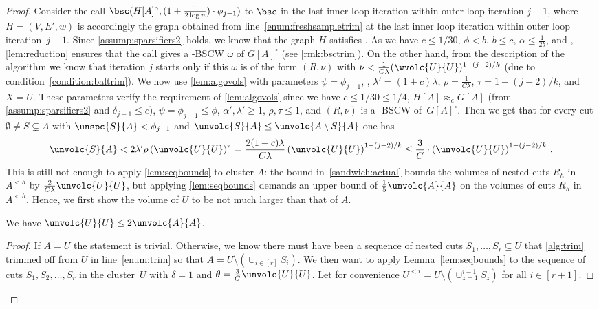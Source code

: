 \begin{proof}
	Consider the call $\bsc(H[A]^\circ, (1+\frac{1}{2\log n}) \cdot \phi_{j-1})$ to $\bsc$ in the last inner loop iteration within outer loop iteration $j-1$, where $H=(V,E',w)$ is accordingly the graph obtained from line~\eqref{enum:freshsampletrim} at the last inner loop iteration within outer loop iteration~${j-1}$. Since \cref{assump:sparsifiers2} holds,  we know that the graph $H$ satisfies . As we have $c \le 1/30$, $\phi < b$, $b \le c$, $\alpha \le \frac{1}{2b}$,  and , \cref{lem:reduction} ensures that the call  gives a -BSCW $\omega$ of $G[A]^\circ$ (see \cref{rmk:bsctrim}). On the other hand, from the description of the algorithm we know that iteration $j$ starts only if this $\omega$ is of the form $(R,\nu)$ with $\nu < \frac{1}{C \lambda}(\wvolc{U}{U})^{1-(j-2)/k}$ (due to condition~\eqref{condition:baltrim}). We now use \cref{lem:algovols} with parameters $\psi=\phi_{j-1}$, , $\lambda' =(1+c)\lambda$, $\rho = \frac{1}{C\lambda}$, $\tau=1-(j-2)/k$, and $X=U$. These parameters verify the requirement of \cref{lem:algovols} since we have $ c\le 1/30 \le 1/4$, $H[A] \approx_{c} G[A]$ (from \cref{assump:sparsifiers2} and $\delta_{j-1} \le c$), $\psi=\phi_{j-1}\le \phi$, $\alpha',\lambda' \ge 1$, $\rho,\tau \le 1$, and $(R,\nu)$ is a -BSCW of~$G[A]^\circ$. Then we get that for every cut $\emptyset \neq  S \subsetneq A$ with $\unspc{S}{A} < \phi_{j-1}$ and $ \unvolc{S}{A} \le \unvolc{A \setminus S}{A}$ one has
	\begin{equation}
		\label{eq:generalcasenobsc}
		\unvolc{S}{A} < 2\lambda' \rho \left(\unvolc{U}{U}\right)^\tau =  \frac{2(1+c)\lambda}{C\lambda} \left( \unvolc{U}{U}\right)^{1-(j-2)/k} \le \frac{3}{C} \cdot \left(\unvolc{U}{U}\right)^{1-(j-2)/k} \, .
	\end{equation}
	This is still not enough to apply \cref{lem:seqbounds} to cluster $A$: the bound in~\eqref{sandwich:actual} bounds the volumes of nested cuts $R_h$ in $A^{<h}$ by $\frac{2}{C\lambda}\unvolc{U}{U}$, but applying \cref{lem:seqbounds} demands an upper bound of $\frac{1}{5}\unvolc{A}{A}$ on the volumes of cuts $R_h$ in $A^{<h}$. Hence, we first show the volume of $U$ to be not much larger than that of $A$.
	
	\begin{claim}
		\label{claim:voluvola}
		We have $\unvolc{U}{U} \le 2 \unvolc{A}{A}$.
	\end{claim}
	\begin{proof}
		If $A=U$ the statement is trivial. Otherwise, we know there must have been a sequence of nested cuts $S_1,\dots,S_r \subseteq U$ that \cref{alg:trim} trimmed off from $U$ in line~\eqref{enum:trim} so that $A=U \setminus (\cup_{i \in [r]} S_i)$. We then want to apply Lemma~\ref{lem:seqbounds} to the sequence of cuts $S_1,S_2, \dots, S_r$ in the cluster~$U$ with $\delta=1$ and $\theta = \frac{3}{C}\unvolc{U}{U}$. Let for convenience $U^{<i} = U \setminus (\cup_{z =1}^{i-1} S_z)$ for all $i \in [r+1]$.
		

\end{proof}
\end{proof}
